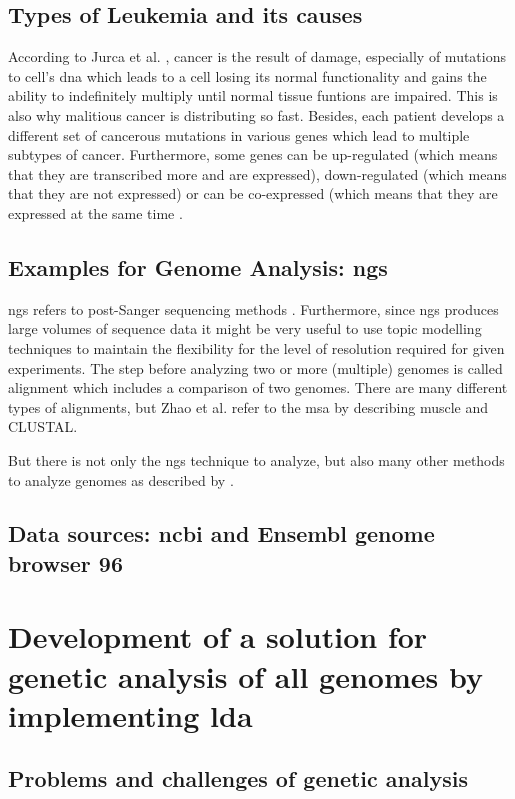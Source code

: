 \section{Types of Leukemia and its causes}\label{leukemia_types}
According to Jurca et al. \autocite{jurca_2016}, cancer is the result of damage, especially of mutations to cell's \gls{dna} which leads to a cell losing its normal functionality and gains the ability to indefinitely multiply until normal tissue funtions are impaired. This is also why malitious cancer is distributing so fast. Besides, each patient develops a different set of cancerous mutations in various genes which lead to multiple subtypes of cancer.
Furthermore, some genes can be up-regulated (which means that they are transcribed more and are expressed), down-regulated (which means that they are not expressed) or can be co-expressed (which means that they are expressed at the same time \autocite{jurca_2016}. 


\section{Examples for Genome Analysis: \gls{ngs}}\label{genome_analysis}
\gls{ngs} refers to post-Sanger sequencing methods \autocite{zhao_2016}. Furthermore, since \gls{ngs} produces large volumes of sequence data it might be very useful to use topic modelling techniques to maintain the flexibility for the level of resolution required for given experiments.  
The step before analyzing two or more (multiple) genomes is called alignment which includes a comparison of two genomes. There are many different types of alignments, but Zhao et al. refer to the \gls{msa} by describing \gls{muscle} and CLUSTAL.

But there is not only the \gls{ngs} technique to analyze, but also many other methods to analyze genomes as described by \autocite{zhao_2016}. 


\section{Data sources: \gls{ncbi} and Ensembl genome browser 96}\label{datasources}

\chapter{Development of a solution for genetic analysis of \gls{all} genomes by implementing \gls{lda}}\label{development}
\section{Problems and challenges of genetic analysis}\label{problems_challenges}
